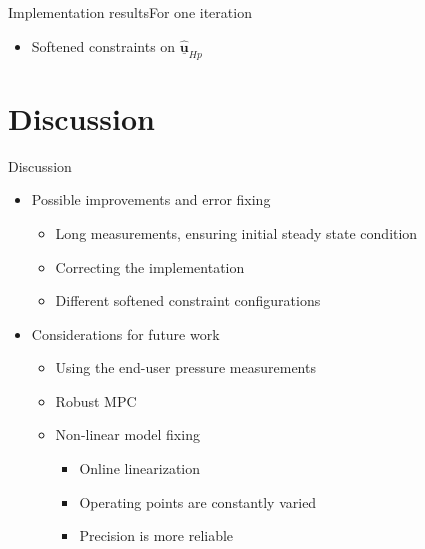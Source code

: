 \begin{frame}{Implementation results}{For one iteration}

\begin{itemize}
	 	\item<1-> Softened constraints on $\hat{\pmb{\underline{u}}}_{Hp}$
	 	\end{itemize}

\begin{figure}[H]
   \centering
    
\end{figure}

\end{frame}


\section{Discussion}
\begin{frame}{Discussion}{}

\begin{itemize}
	\item<1-> Possible improvements and error fixing
	\begin{itemize}
	 \item<1-> Long measurements, ensuring initial steady state condition
	 \item<1-> Correcting the implementation
	 \item<1-> Different softened constraint configurations

	\end{itemize}
\end{itemize}

\begin{itemize}
\item<2-> Considerations for future work
	 \begin{itemize}
	 \item<2-> Using the end-user pressure measurements
	 \item<2-> Robust MPC
	 \item<2-> Non-linear model fixing

		\begin{itemize}
	 	\item<3-> Online linearization
	 	\item<3-> Operating points are constantly varied
	 	\item<3-> Precision is more reliable
	 	\end{itemize}

	 \end{itemize}
\end{itemize}

\end{frame}
